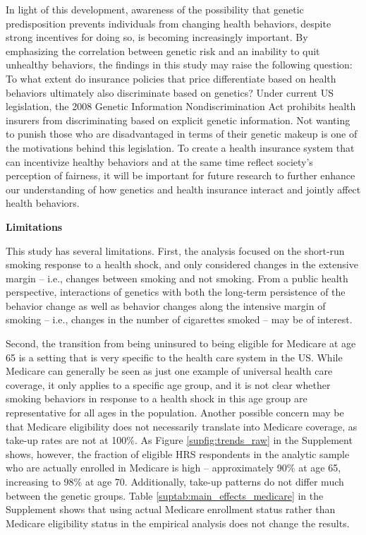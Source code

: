 \documentclass[12pt]{article}
\begin{document}
In light of this development, awareness of the possibility that genetic predisposition prevents individuals from changing health behaviors, despite strong incentives for doing so, is becoming increasingly important. By emphasizing the correlation between genetic risk and an inability to quit unhealthy behaviors, the findings in this study may raise the following question: To what extent do insurance policies that price differentiate based on health behaviors ultimately also discriminate based on genetics? Under current US legislation, the 2008 Genetic Information Nondiscrimination Act prohibits health insurers from discriminating based on explicit genetic information. Not wanting to punish those who are disadvantaged in terms of their genetic makeup is one of the motivations behind this legislation. To create a health insurance system that can incentivize healthy behaviors and at the same time reflect society's perception of fairness, it will be important for future research to further enhance our understanding of how genetics and health insurance interact and jointly affect health behaviors.

\vspace{5mm}


\noindent\textbf{\textsf{\textcolor{NavyBlue}{Limitations}}}

\noindent This study has several limitations. First, the analysis focused on the short-run smoking response to a health shock, and only considered changes in the extensive margin -- i.e., changes between smoking and not smoking. From a public health perspective, interactions of genetics with both the long-term persistence of the behavior change as well as behavior changes along the intensive margin of smoking -- i.e., changes in the number of cigarettes smoked -- may be of interest.

Second, the transition from being uninsured to being eligible for Medicare at age 65 is a setting that is very specific to the health care system in the US. While Medicare can generally be seen as just one example of universal health care coverage, it only applies to a specific age group, and it is not clear whether smoking behaviors in response to a health shock in this age group are representative for all ages in the population. Another possible concern may be that Medicare eligibility does not necessarily translate into Medicare coverage, as take-up rates are not at 100\%. As Figure \ref*{supfig:trends_raw} in the Supplement shows, however, the fraction of eligible HRS respondents in the analytic sample who are actually enrolled in Medicare is high -- approximately 90\% at age 65, increasing to 98\% at age 70. Additionally, take-up patterns do not differ much between the genetic groups. Table \ref*{suptab:main_effects_medicare} in the Supplement shows that using actual Medicare enrollment status rather than Medicare eligibility status in the empirical analysis does not change the results.
\end{document}
